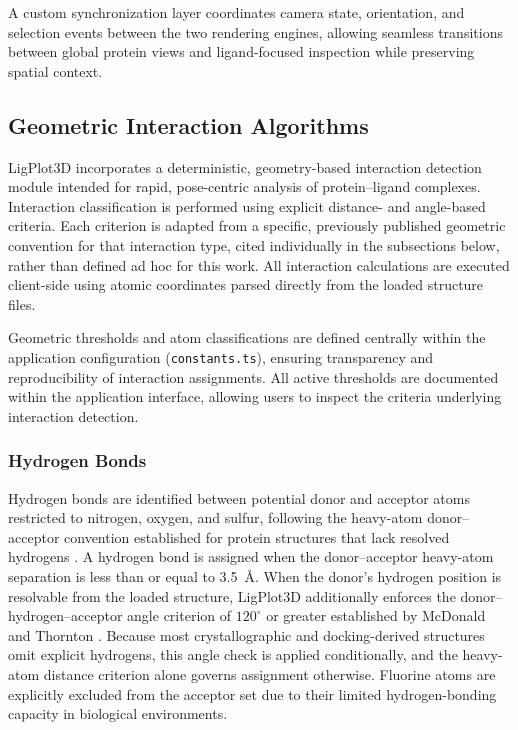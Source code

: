 \documentclass[lettersize,journal]{IEEEtran}
\begin{document}
A custom synchronization layer coordinates camera state, orientation, and selection events between the two rendering engines, allowing seamless transitions between global protein views and ligand-focused inspection while preserving spatial context.

\subsection{Geometric Interaction Algorithms}
LigPlot3D incorporates a deterministic, geometry-based interaction detection module intended for rapid, pose-centric analysis of protein--ligand complexes. Interaction classification is performed using explicit distance- and angle-based criteria. Each criterion is adapted from a specific, previously published geometric convention for that interaction type, cited individually in the subsections below, rather than defined ad hoc for this work. All interaction calculations are executed client-side using atomic coordinates parsed directly from the loaded structure files.

Geometric thresholds and atom classifications are defined centrally within the application configuration (\texttt{constants.ts}), ensuring transparency and reproducibility of interaction assignments. All active thresholds are documented within the application interface, allowing users to inspect the criteria underlying interaction detection.

\subsubsection{Hydrogen Bonds}
Hydrogen bonds are identified between potential donor and acceptor atoms restricted to nitrogen, oxygen, and sulfur, following the heavy-atom donor–acceptor convention established for protein structures that lack resolved hydrogens \cite{bakerhubbard1984hbond}. A hydrogen bond is assigned when the donor–acceptor heavy-atom separation is less than or equal to 3.5~\AA. When the donor's hydrogen position is resolvable from the loaded structure, LigPlot3D additionally enforces the donor–hydrogen–acceptor angle criterion of $120^{\circ}$ or greater established by McDonald and Thornton \cite{mcdonaldthornton1994hbond}. Because most crystallographic and docking-derived structures omit explicit hydrogens, this angle check is applied conditionally, and the heavy-atom distance criterion alone governs assignment otherwise. Fluorine atoms are explicitly excluded from the acceptor set due to their limited hydrogen-bonding capacity in biological environments.
\end{document}
